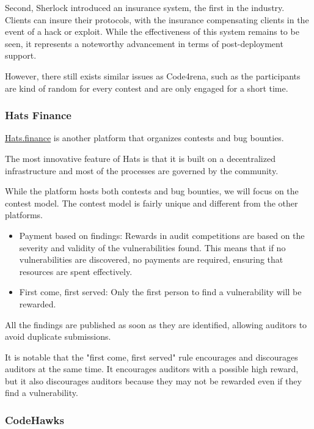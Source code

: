 \documentclass[10pt]{extarticle}
\def\tightlist{}
\begin{document}
Second, Sherlock introduced an insurance system, the first in the
industry. Clients can insure their protocols, with the insurance
compensating clients in the event of a hack or exploit. While the
effectiveness of this system remains to be seen, it represents a
noteworthy advancement in terms of post-deployment support.

However, there still exists similar issues as Code4rena, such as the participants are kind of random for every contest and are only engaged for a short time.

\subsubsection{ Hats Finance}\label{333-hats-finance}

\href{https://app.hats.finance/}{Hats.finance} is another platform that
organizes contests and bug bounties.

The most innovative feature of Hats is that it is built on a
decentralized infrastructure and most of the processes are governed by
the community.

While the platform hosts both contests and bug bounties, we will focus
on the contest model. The contest model is fairly unique and different
from the other platforms.

\begin{itemize}
\tightlist
\item
  Payment based on findings: Rewards in audit competitions are based on
  the severity and validity of the vulnerabilities found. This means
  that if no vulnerabilities are discovered, no payments are required,
  ensuring that resources are spent effectively.
\item
  First come, first served: Only the first person to find a
  vulnerability will be rewarded.
\end{itemize}

All the findings are published as soon as they are identified, allowing
auditors to avoid duplicate submissions.

It is notable that the "first come, first served" rule encourages and
discourages auditors at the same time. It encourages auditors with a
possible high reward, but it also discourages auditors because they may
not be rewarded even if they find a vulnerability.

\subsubsection{ CodeHawks}\label{334-codehawks}
\end{document}
